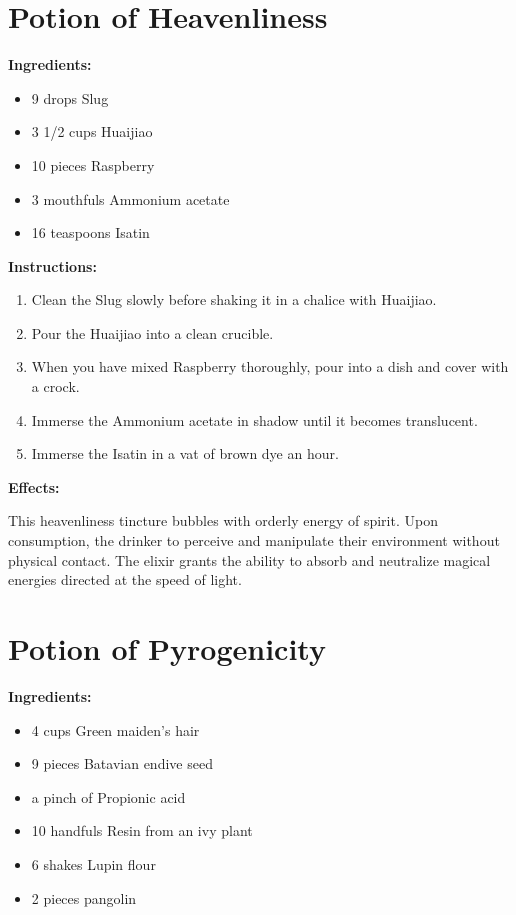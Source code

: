 \documentclass{article}
\begin{document}
\newpage
\section*{Potion of Heavenliness}

\textbf{Ingredients:}

\begin{itemize}
  \item 9 drops Slug
  \item 3 1/2 cups Huaijiao
  \item 10 pieces Raspberry
  \item 3 mouthfuls Ammonium acetate
  \item 16 teaspoons Isatin
\end{itemize}

\textbf{Instructions:}

\begin{enumerate}
  \item Clean the Slug slowly before shaking it in a chalice with Huaijiao.
  \item Pour the Huaijiao into a clean crucible.
  \item When you have mixed Raspberry thoroughly, pour into a dish and cover with a crock.
  \item Immerse the Ammonium acetate in shadow until it becomes translucent.
  \item Immerse the Isatin in a vat of brown dye an hour.
\end{enumerate}

\textbf{Effects:}

This heavenliness tincture bubbles with orderly energy of spirit. Upon consumption, the drinker to perceive and manipulate their environment without physical contact. The elixir grants the ability to absorb and neutralize magical energies directed at the speed of light.

\newpage
\section*{Potion of Pyrogenicity}

\textbf{Ingredients:}

\begin{itemize}
  \item 4 cups Green maiden's hair
  \item 9 pieces Batavian endive seed
  \item a pinch of Propionic acid
  \item 10 handfuls Resin from an ivy plant
  \item 6 shakes Lupin flour
  \item 2 pieces pangolin
\end{itemize}
\end{document}
